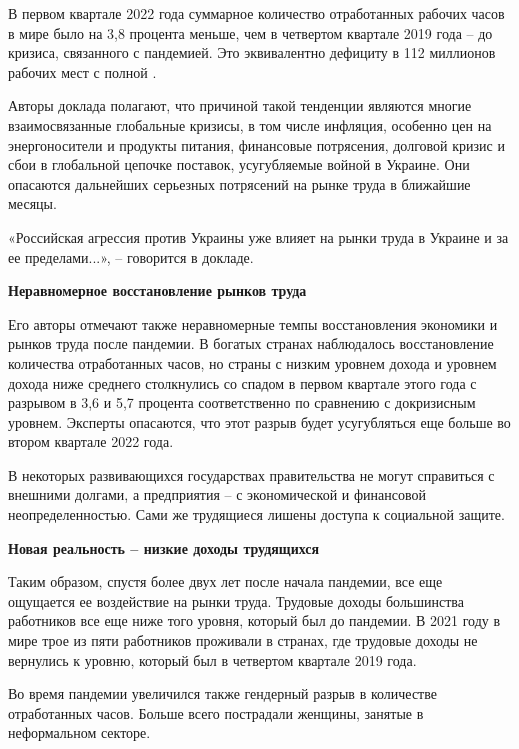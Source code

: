 В первом квартале 2022 года суммарное количество отработанных рабочих часов в мире было на 3,8 процента меньше, чем в четвертом квартале 2019 года – до кризиса, связанного с пандемией. Это эквивалентно дефициту в 112 миллионов рабочих мест с полной
.


Авторы доклада полагают, что причиной такой тенденции являются многие взаимосвязанные глобальные кризисы, в том числе инфляция, особенно цен на энергоносители и продукты питания, финансовые потрясения, долговой кризис и сбои в глобальной цепочке поставок, усугубляемые войной в Украине. Они опасаются дальнейших серьезных потрясений на рынке труда в ближайшие месяцы.

«Российская агрессия против Украины уже влияет на рынки труда в Украине и за ее пределами...», – говорится в докладе.

\textbf{Неравномерное восстановление рынков труда}

Его авторы отмечают также неравномерные темпы восстановления экономики и рынков труда после пандемии. В богатых странах наблюдалось восстановление количества отработанных часов, но страны с низким уровнем дохода и уровнем дохода ниже среднего столкнулись со спадом в первом квартале этого года с разрывом в 3,6 и 5,7 процента соответственно по сравнению с докризисным уровнем. Эксперты опасаются, что этот разрыв будет усугубляться еще больше во втором квартале 2022 года.


В некоторых развивающихся государствах правительства не могут справиться с внешними долгами, а предприятия – с экономической и финансовой неопределенностью. Сами же трудящиеся лишены доступа к социальной защите.

\textbf{Новая реальность – низкие доходы трудящихся}

Таким образом, спустя более двух лет после начала пандемии, все еще ощущается ее воздействие на рынки труда. Трудовые доходы большинства работников все еще ниже того уровня, который был до пандемии. В 2021 году в мире трое из пяти работников проживали в странах, где трудовые доходы не вернулись к уровню, который был в четвертом квартале 2019 года.

Во время пандемии увеличился также гендерный разрыв в количестве отработанных часов. Больше всего пострадали женщины, занятые в неформальном секторе.

